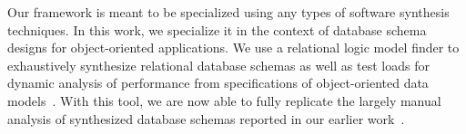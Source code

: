 \documentclass[10pt,conference]{IEEEtran}
\begin{document}


Our framework is meant to be specialized using any types of %
software synthesis techniques. 
In this work, we specialize it in the context of database schema designs for object-oriented applications.
We use a relational logic model finder to exhaustively synthesize relational database schemas as well as test loads for dynamic analysis of performance from specifications of object-oriented data models~\cite{spacemaker, trademaker}.
With this tool, we are now able to fully replicate the largely manual analysis of synthesized database schemas reported in our earlier work~\cite{trademaker}.  



\end{document}
